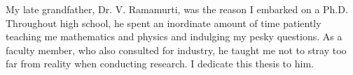 My late grandfather, Dr. V. Ramamurti, was the reason I embarked on a Ph.D.
Throughout high school, he spent an inordinate amount of time patiently
teaching me mathematics and physics and indulging my pesky questions. As a
faculty member, who also consulted for industry, he taught me not to stray too
far from reality when conducting research. I dedicate this thesis to him.
